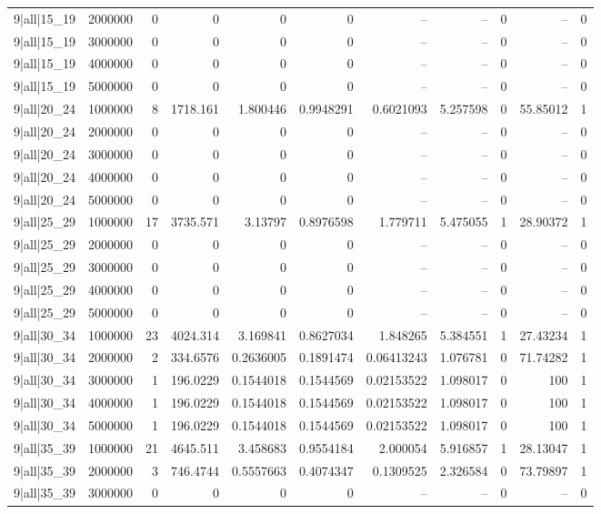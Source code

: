 \begin{tabular}{lrrrrrrrrrr}
9|all|15\_19 & 2000000 & 0 & 0 & 0 & 0 & -- & -- & 0 & -- & 0 \\
9|all|15\_19 & 3000000 & 0 & 0 & 0 & 0 & -- & -- & 0 & -- & 0 \\
9|all|15\_19 & 4000000 & 0 & 0 & 0 & 0 & -- & -- & 0 & -- & 0 \\
9|all|15\_19 & 5000000 & 0 & 0 & 0 & 0 & -- & -- & 0 & -- & 0 \\
9|all|20\_24 & 1000000 & 8 & 1718.161 & 1.800446 & 0.9948291 & 0.6021093 & 5.257598 & 0 & 55.85012 & 1 \\
9|all|20\_24 & 2000000 & 0 & 0 & 0 & 0 & -- & -- & 0 & -- & 0 \\
9|all|20\_24 & 3000000 & 0 & 0 & 0 & 0 & -- & -- & 0 & -- & 0 \\
9|all|20\_24 & 4000000 & 0 & 0 & 0 & 0 & -- & -- & 0 & -- & 0 \\
9|all|20\_24 & 5000000 & 0 & 0 & 0 & 0 & -- & -- & 0 & -- & 0 \\
9|all|25\_29 & 1000000 & 17 & 3735.571 & 3.13797 & 0.8976598 & 1.779711 & 5.475055 & 1 & 28.90372 & 1 \\
9|all|25\_29 & 2000000 & 0 & 0 & 0 & 0 & -- & -- & 0 & -- & 0 \\
9|all|25\_29 & 3000000 & 0 & 0 & 0 & 0 & -- & -- & 0 & -- & 0 \\
9|all|25\_29 & 4000000 & 0 & 0 & 0 & 0 & -- & -- & 0 & -- & 0 \\
9|all|25\_29 & 5000000 & 0 & 0 & 0 & 0 & -- & -- & 0 & -- & 0 \\
9|all|30\_34 & 1000000 & 23 & 4024.314 & 3.169841 & 0.8627034 & 1.848265 & 5.384551 & 1 & 27.43234 & 1 \\
9|all|30\_34 & 2000000 & 2 & 334.6576 & 0.2636005 & 0.1891474 & 0.06413243 & 1.076781 & 0 & 71.74282 & 1 \\
9|all|30\_34 & 3000000 & 1 & 196.0229 & 0.1544018 & 0.1544569 & 0.02153522 & 1.098017 & 0 & 100 & 1 \\
9|all|30\_34 & 4000000 & 1 & 196.0229 & 0.1544018 & 0.1544569 & 0.02153522 & 1.098017 & 0 & 100 & 1 \\
9|all|30\_34 & 5000000 & 1 & 196.0229 & 0.1544018 & 0.1544569 & 0.02153522 & 1.098017 & 0 & 100 & 1 \\
9|all|35\_39 & 1000000 & 21 & 4645.511 & 3.458683 & 0.9554184 & 2.000054 & 5.916857 & 1 & 28.13047 & 1 \\
9|all|35\_39 & 2000000 & 3 & 746.4744 & 0.5557663 & 0.4074347 & 0.1309525 & 2.326584 & 0 & 73.79897 & 1 \\
9|all|35\_39 & 3000000 & 0 & 0 & 0 & 0 & -- & -- & 0 & -- & 0 \\

\end{tabular}
